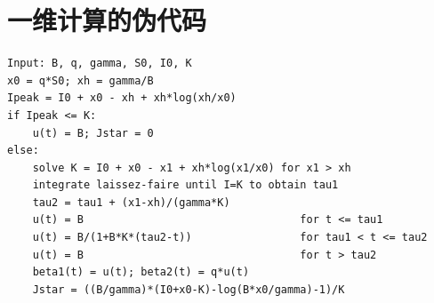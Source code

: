 \documentclass[11pt,a4paper,UTF8]{ctexart}
\theoremstyle{definition}
\begin{document}
\section{一维计算的伪代码}

\begin{lstlisting}[basicstyle=\ttfamily\small,frame=single,breaklines=true]
Input: B, q, gamma, S0, I0, K
x0 = q*S0; xh = gamma/B
Ipeak = I0 + x0 - xh + xh*log(xh/x0)
if Ipeak <= K:
    u(t) = B; Jstar = 0
else:
    solve K = I0 + x0 - x1 + xh*log(x1/x0) for x1 > xh
    integrate laissez-faire until I=K to obtain tau1
    tau2 = tau1 + (x1-xh)/(gamma*K)
    u(t) = B                                  for t <= tau1
    u(t) = B/(1+B*K*(tau2-t))                 for tau1 < t <= tau2
    u(t) = B                                  for t > tau2
    beta1(t) = u(t); beta2(t) = q*u(t)
    Jstar = ((B/gamma)*(I0+x0-K)-log(B*x0/gamma)-1)/K
\end{lstlisting}



\end{document}
